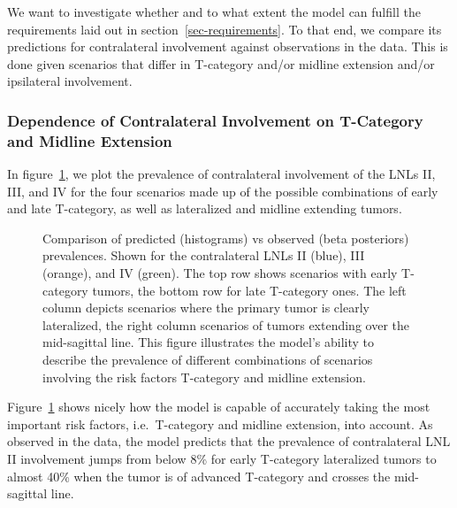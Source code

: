 \documentclass[
  sn-mathphys-num,
]{sn-jnl}
\begin{document}
We want to investigate whether and to what extent the model can fulfill
the requirements laid out in section~\ref{sec-requirements}. To that
end, we compare its predictions for contralateral involvement against
observations in the data. This is done given scenarios that differ in
T-category and/or midline extension and/or ipsilateral involvement.

\subsubsection{Dependence of Contralateral Involvement on T-Category and
Midline
Extension}\label{dependence-of-contralateral-involvement-on-t-category-and-midline-extension}

In figure~\ref{fig-model-prevalences-overall}, we plot the prevalence of
contralateral involvement of the LNLs II, III, and IV for the four
scenarios made up of the possible combinations of early and late
T-category, as well as lateralized and midline extending tumors.

\begin{figure}


\caption{\label{fig-model-prevalences-overall}Comparison of predicted
(histograms) vs observed (beta posteriors) prevalences. Shown for the
contralateral LNLs II (blue), III (orange), and IV (green). The top row
shows scenarios with early T-category tumors, the bottom row for late
T-category ones. The left column depicts scenarios where the primary
tumor is clearly lateralized, the right column scenarios of tumors
extending over the mid-sagittal line. This figure illustrates the
model's ability to describe the prevalence of different combinations of
scenarios involving the risk factors T-category and midline extension.}

\end{figure}%

Figure~\ref{fig-model-prevalences-overall} shows nicely how the model is
capable of accurately taking the most important risk factors,
i.e.~T-category and midline extension, into account. As observed in the
data, the model predicts that the prevalence of contralateral LNL II
involvement jumps from below 8\% for early T-category lateralized tumors
to almost 40\% when the tumor is of advanced T-category and crosses the
mid-sagittal line.
\end{document}
